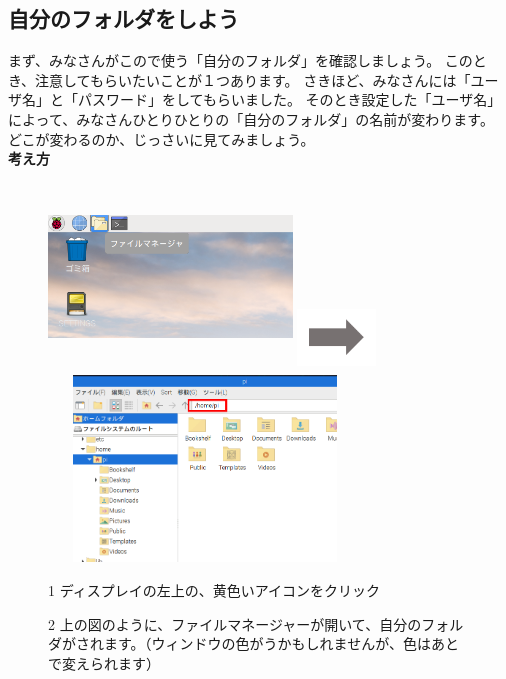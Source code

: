 \documentclass[a4paper,12pt]{jarticle}
\begin{document}
\clearpage

\subsection{\theExercise 自分のフォルダをしよう}
まず、みなさんがこので使う「自分のフォルダ」を確認しましょう。
このとき、注意してもらいたいことが１つあります。
さきほど、みなさんには「ユーザ名」と「パスワード」をしてもらいました。
そのとき設定した「ユーザ名」によって、みなさんひとりひとりの「自分のフォルダ」の名前が変わります。
どこが変わるのか、じっさいに見てみましょう。\\

{\bf \large 考え方}\\
\begin{figure}[ht]
\begin{minipage}{\textwidth}
  \includegraphics[width=6.472cm,height=4.976cm]{textbook-img032.png}
  \includegraphics[width=2.094cm,height=1.771cm]{textbook-img035.png}
  \includegraphics[width=8.301cm,height=4.948cm]{textbook-img1020.png}
\end{minipage}
\begin{minipage}{0.4\textwidth}
  1
  ディスプレイの左上の、黄色いアイコンをクリック
\end{minipage}
\vspace{20pt}
\hfill
\begin{minipage}{0.4\textwidth}
  2
  上の図のように、ファイルマネージャーが開いて、自分のフォルダがされます。（ウィンドウの色がうかもしれませんが、色はあとで変えられます）
\end{minipage}
\end{figure}
\end{document}
